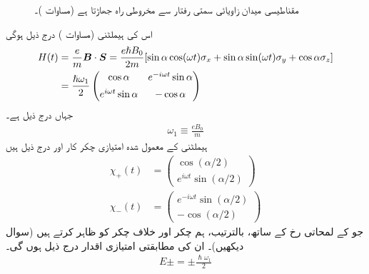 \begin{figure}
\centering
{}
\caption{مقناطیسی میدان  زاویائی   سمتی رفتار  سے مخروطی راہ جھاڑتا ہے (مساوات )۔   }
\label{شکل_حرارت_نا_گزر_مخروطی_راہ_جھاڑنا}
\end{figure}


اس کی ہیملٹنی (مساوات  )   درج ذیل ہوگی
\begin{gather}
\begin{aligned}\label{مساوات_حر_مخصوص_ہیملٹنی}
H(t) &= \frac{e}{m} {{\boldsymbol{B}}} \cdot {\ensuremath{{\boldsymbol{S}}}} = \frac{e \hslash B_0}{2m} [\sin \alpha \cos(\omega t) \sigma_x + \sin \alpha \sin(\omega t) \sigma_y + \cos \alpha \sigma_z] \\
&= \frac{\hslash \omega_1}{2}
\begin{pmatrix}
\cos \alpha& e^{-i\omega t}\sin \alpha\\[0.5em]
e^{i\omega t}\sin\alpha& -\cos\alpha
\end{pmatrix} 
\end{aligned}
\end{gather}
جہاں  درج ذیل ہے۔
\begin{align}
\omega_1 \equiv \frac{e B_0}{m}
\end{align}
ہیملٹنی  کے معمول شدہ امتیازی چکر کار   اور  درج ذیل ہیں
\begin{align}
\chi_+ (t) &= 
\begin{pmatrix}
\cos(\alpha/2) \\[0.5em]
e^{i \omega t} \sin(\alpha/2)
\end{pmatrix}\\
\chi_{-} (t) &= 
\begin{pmatrix}
e^{-i \omega t} \sin(\alpha/2) \\[0.5em]
- \cos(\alpha/2)
\end{pmatrix}
\end{align}
جو  کے لمحاتی رخ کے ساتھ، بالترتیب،  ہم چکر اور خلاف چکر کو ظاہر کرتے ہیں (سوال    دیکھیں)۔  ان کی مطابقتی امتیازی اقدار درج ذیل ہوں گی۔
\begin{align}\label{مساوات_حر_حرکی_ہیّت_توانائی}
E \pm = \pm \frac{\hslash \omega_1}{2}
\end{align}

